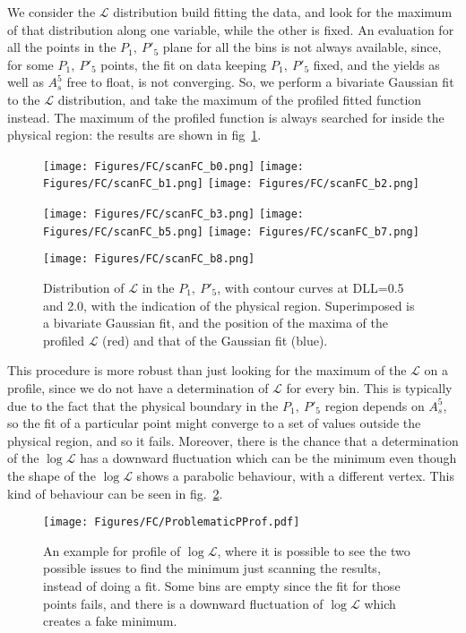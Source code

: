 We consider the $\mathcal{L}$ distribution build fitting the data, and look for the maximum of that distribution along one variable, while the other is fixed.
An evaluation for all the points in the $P_1,~P'_5$ plane for all the bins is not always available, since, for some $P_1,~P'_5$ points, the fit on data keeping $P_1,~P'_5$ fixed, and the yields as well as $A_s^5$ free to float, is not converging.
So, we perform a bivariate Gaussian fit to the $\mathcal{L}$ distribution, and take the maximum of the profiled fitted function instead.
The maximum of the profiled function is always searched for inside the physical region: the results are shown in fig~\ref{fig:profileL}.

\begin{figure}
  \centering
  \texttt{[image: Figures/FC/scanFC\_b0.png]}
  \texttt{[image: Figures/FC/scanFC\_b1.png]}
  \texttt{[image: Figures/FC/scanFC\_b2.png]}

  \texttt{[image: Figures/FC/scanFC\_b3.png]}
  \texttt{[image: Figures/FC/scanFC\_b5.png]}
  \texttt{[image: Figures/FC/scanFC\_b7.png]}

  \texttt{[image: Figures/FC/scanFC\_b8.png]}
  \caption{Distribution of $\mathcal{L}$ in the $P_1,~P'_5$, with contour curves at DLL=0.5 and 2.0, with the indication of the physical region.
    Superimposed is a bivariate Gaussian fit, and the position of the maxima of the profiled $\mathcal{L}$ (red) and that of the Gaussian fit (blue).}
  \label{fig:profileL}
\end{figure}

This procedure is more robust than just looking for the maximum of the $\mathcal{L}$ on a profile, since we do not have a determination of $\mathcal{L}$ for every bin.
This is typically due to the fact that the physical boundary in the  $P_1,~P'_5$ region depends on $A_s^5$, so the fit of a particular point might converge to a set of values outside the physical region, and so it fails.
Moreover, there is the chance that a determination of the $\log\mathcal{L}$ has a downward fluctuation which can be the minimum even though the shape of the $\log\mathcal{L}$ shows a parabolic behaviour, with a different vertex.
This kind of behaviour can be seen in fig.~\ref{fig:ProblematicPProf}.

\begin{figure}
  \centering
  \texttt{[image: Figures/FC/ProblematicPProf.pdf]}
  \caption{An example for profile of $\log\mathcal{L}$, where it is possible to see the two possible issues to find the minimum just scanning the results, instead of doing a fit.
    Some bins are empty since the fit for those points fails, and there is a downward fluctuation of $\log\mathcal{L}$ which creates a fake minimum.}
  \label{fig:ProblematicPProf}
\end{figure}

